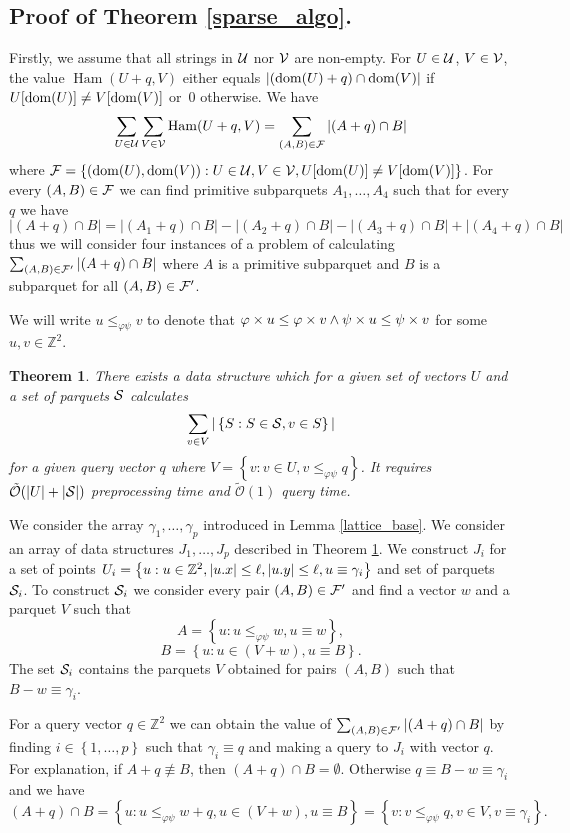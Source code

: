 \documentclass[11pt]{article}
\DeclareMathOperator*{\Ham}{Ham}
\newcommand{\Z}{\mathbb{Z}}
\newcommand{\tO}{\tilde{\mathcal{O}}}
\renewcommand{\phi}{\varphi}
\newcommand{\set}[1]{\left\lbrace #1 \right\rbrace}
\theoremstyle{plain}
\newtheorem{theorem}{Theorem}
\theoremstyle{definition}
\theoremstyle{remark}
\begin{document}
\subsection{Proof of Theorem \ref{sparse_algo}.}


Firstly, we assume that all strings in $\U$ nor $\V$ are non-empty.
For $U \in \U$, $V \in \V$, the value $ \Ham(U + q, V)$ either equals $|(\d{U} + q) \cap \d{V}|$ if $U[\d{U}] \neq V[\d{V}]$ or~$0$ otherwise.
We have
$$ \sum_{U \in \U} \sum_{V \in \V} \Ham(U + q, V) = \sum_{(A, B) \in \F} |(A + q) \cap B| $$
where $ \F = \set{(\d{U}, \d{V}) : U \in \U, V \in \V, U[\d{U}] \neq V[\d{V}]} $. 
For every $(A, B) \in \F$ we can find primitive subparquets $A_1, \dots, A_4$ such that for every $q$ we have
$$ |(A + q) \cap B| = |(A_1 + q) \cap B| - |(A_2 + q) \cap B| - |(A_3 + q) \cap B| + |(A_4 + q) \cap B| $$
thus we will consider four instances of a problem of calculating $\sum_{(A, B) \in \F'} |(A + q) \cap B|$ where $A$ is a primitive subparquet and $B$ is a subparquet for all $(A, B) \in \F'$.

We will write $u \le_{\phi\psi} v$ to denote that $\h{u} \le \h{v} \wedge \s{u} \le \s{v}$ for some $u, v \in \Z^2$.


\begin{theorem}\label{sweeper}
	There exists a data structure which for a given set of vectors $U$ and a set of parquets $\S$ calculates
	$$ \sum_{v \in V} |\set{S : S \in \S, v \in S}| $$
	for a given query vector $q$ where $V = \set{v : v \in U, v \le_{\phi\psi} q}$.
	It requires $\tO(|U| + |\S|)$ preprocessing time and $\tO(1)$ query time.
\end{theorem}


We consider the array $\gamma_1, \dots, \gamma_p$ introduced in Lemma \ref{lattice_base}.
We consider an array of data structures $J_1, \dots, J_p$ described in Theorem \ref{sweeper}.
We construct $J_i$ for a set of points $U_i = \set{u : u \in \Z^2, |\x{u}| \le \ell, |\y{u}| \le \ell, u \equiv \gamma_i}$ and set of parquets $\S_i$.
To construct $\S_i$ we consider every pair $(A, B) \in \F'$ and find a vector $w$ and a parquet $V$ such that 
$$ A = \set{u : u \le_{\phi\psi} w, u \equiv w},$$
$$ B = \set{u : u \in (V + w), u \equiv B}.$$
The set $\S_i$ contains the parquets $V$ obtained for pairs $(A, B)$ such that $B - w \equiv \gamma_i$.

For a query vector $q \in \Z^2$ we can obtain the value of $\sum_{(A, B) \in \F'} |(A + q) \cap B|$ by finding $i \in \set{1, \dots, p}$ such that $\gamma_i \equiv q$ and making a query to $J_i$ with vector $q$. 
For explanation, if $A + q \not \equiv B$, then $(A + q) \cap B = \emptyset$.
Otherwise $q \equiv B - w \equiv \gamma_i$ and we have
$$ (A + q) \cap B = \set{u : u \le_{\phi\psi} w + q, u \in (V + w), u \equiv B} = \set{v : v \le_{\phi\psi} q, v \in V, v \equiv \gamma_i}.$$
\end{document}
